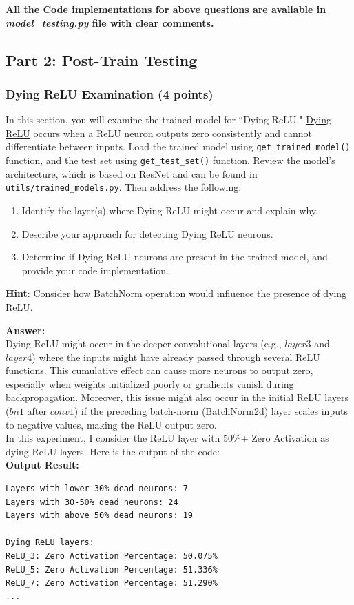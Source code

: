 \documentclass[11pt, oneside]{article}   	%
\begin{document}
\textbf{All the Code implementations for above questions are avaliable in \textit{model\_testing.py} file with clear comments.}

\subsection*{Part 2: Post-Train Testing}

\subsubsection*{Dying ReLU Examination (4 points)}
In this section, you will examine the trained model for ``Dying ReLU." \href{https://datascience.stackexchange.com/questions/5706/what-is-the-dying-relu-problem-in-neural-networks}{Dying ReLU} occurs when a ReLU neuron outputs zero consistently and cannot differentiate between inputs. 
Load the trained model using \texttt{get\_trained\_model()} function, and the test set using \texttt{get\_test\_set()} function. Review the model's architecture, which is based on ResNet and can be found in \texttt{utils/trained\_models.py}. Then address the following:

\begin{enumerate}
    \item Identify the layer(s) where Dying ReLU might occur and explain why.
    \item Describe your approach for detecting Dying ReLU neurons. 
    \item Determine if Dying ReLU neurons are present in the trained model, and provide your code implementation.
\end{enumerate}
\textbf{Hint}:
Consider how BatchNorm operation would influence the presence of dying ReLU.

\textbf{Answer:} \\
Dying ReLU might occur in the deeper convolutional layers (e.g., $layer3$ and $layer4$) where the inputs might have already passed through several ReLU functions. This cumulative effect can cause more neurons to output zero, especially when weights initialized poorly or gradients vanish during backpropagation. Moreover, this issue might also occur in the initial ReLU layers ($bn1$ after $conv1$) if the preceding batch-norm (BatchNorm2d) layer scales inputs to negative values, making the ReLU output zero.
\\
In this experiment, I consider the ReLU layer with 50\%+ Zero Activation as dying ReLU layers. Here is the output of the code:
\\
\textbf{Output Result: }
\begin{verbatim}
Layers with lower 30% dead neurons: 7
Layers with 30-50% dead neurons: 24
Layers with above 50% dead neurons: 19

Dying ReLU layers:
ReLU_3: Zero Activation Percentage: 50.075%
ReLU_5: Zero Activation Percentage: 51.336%
ReLU_7: Zero Activation Percentage: 51.290%
...
\end{verbatim}
\end{document}
